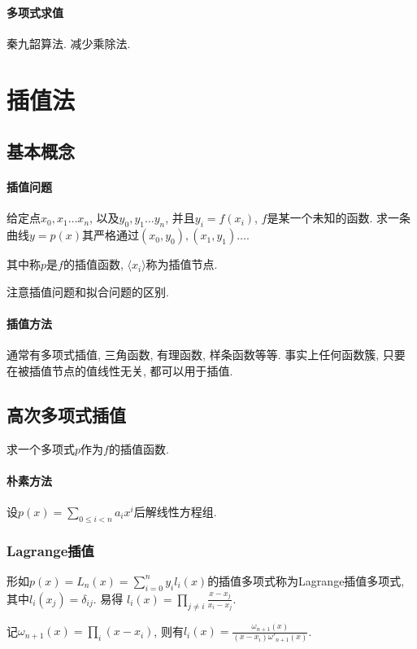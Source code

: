 \documentclass{ctexart}
\newcommand{\Nset}{\mathbb{N}}
\begin{document}
\paragraph{多项式求值} 秦九韶算法. 减少乘除法.



\section{插值法}
\subsection{基本概念}
\paragraph{插值问题} 给定点$x_0, x_1\ldots x_n$, 以及$y_0,y_1\ldots y_n$,
    并且$y_i = f(x_i)$, $f$是某一个未知的函数.
    求一条曲线$y=p(x)$其严格通过$(x_0,y_0), (x_1,y_1)\ldots$.\par
    其中称$p$是$f$的插值函数, $\langle x_i \rangle$称为插值节点.\par
    注意插值问题和拟合问题的区别.
\paragraph{插值方法} 通常有多项式插值, 三角函数, 有理函数, 样条函数等等.
    事实上任何函数簇, 只要在被插值节点的值线性无关, 都可以用于插值.
\subsection{高次多项式插值}
    求一个多项式$p$作为$f$的插值函数.
\paragraph{朴素方法} 设$p(x) = \sum_{0 \le i < n} a_i x^i$后解线性方程组.
\subsubsection{Lagrange插值}

    形如$p(x) = L_n(x) = \sum_{i=0}^n y_i l_i(x)$的插值多项式称为Lagrange插值多项式,
    其中$l_i(x_j) = \delta_{ij}$.
    易得 $l_i(x) = \prod_{j \neq i} \frac{x - x_j}{x_i - x_j}$.\par
    记$\omega_{n+1}(x) = \prod_i (x-x_i)$,
    则有$l_i(x) = \frac{\omega_{n+1}(x)}{(x-x_i) \omega'_{n+1}(x)}$.
\end{document}
